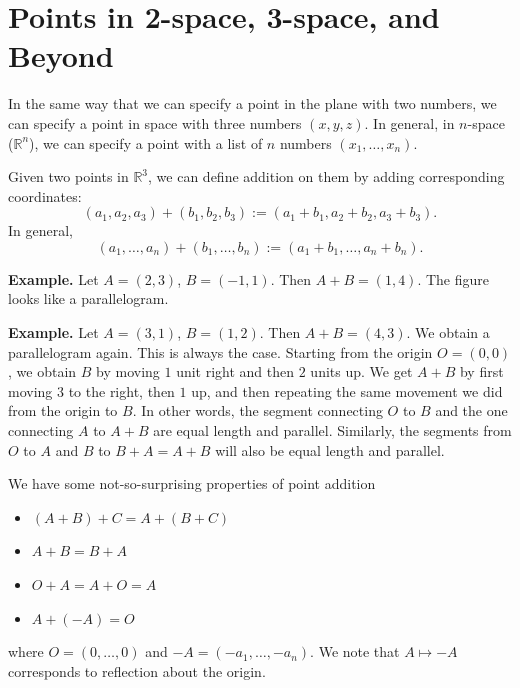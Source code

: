 \documentclass{article}
\begin{document}





\section*{Points in 2-space, 3-space, and Beyond}

In the same way that we can specify a point in the plane with 
two numbers, we can specify a point in space with three numbers
$(x,y,z)$. In general, in $n$-space ($\mathbb{R}^n$), we can specify
a point with a list of $n$ numbers $(x_1,\ldots,x_n)$.

Given two points in $\mathbb{R}^3$, we can define addition on them 
by adding corresponding coordinates:
\[(a_1,a_2,a_3)+(b_1,b_2,b_3):=(a_1+b_1, a_2+b_2, a_3+b_3).\]
In general,
\[(a_1,\ldots,a_n)+(b_1,\ldots,b_n):=(a_1+b_1,\ldots,a_n+b_n).\]

\textbf{Example.}
Let $A=(2,3)$, $B=(-1,1)$. Then $A+B=(1,4)$.
The figure looks like a parallelogram.

\textbf{Example.}
Let $A=(3,1)$, $B=(1,2)$. Then $A+B=(4,3)$.
We obtain a parallelogram again. This is always the case.
Starting from the origin $O=(0,0)$, we obtain $B$ by moving $1$
unit right and then $2$ units up. We get $A+B$ by first moving 
$3$ to the right, then $1$ up, and then repeating the same movement 
we did from the origin to $B$. In other words, the segment connecting
$O$ to $B$ and the one connecting $A$ to $A+B$ are equal length and parallel.
Similarly, the segments from $O$ to $A$ and $B$ to $B+A = A+B$ will also be equal length and parallel.

We have some not-so-surprising properties of point addition
\begin{itemize}
    \item $(A+B)+C=A+(B+C)$
    \item $A + B = B + A$
    \item $O + A = A + O = A$
    \item $A + (-A) = O$
\end{itemize}
where $O=(0,\ldots,0)$ and $-A = (-a_1, \ldots, -a_n)$.
We note that $A \mapsto -A$ corresponds to reflection about the origin.
\end{document}
